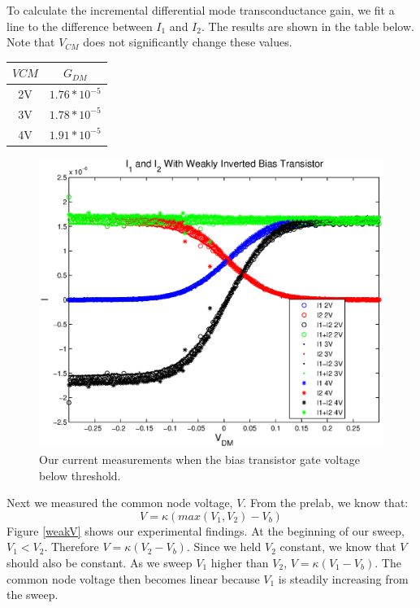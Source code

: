 \documentclass{article}
\begin{document}
To calculate the incremental differential mode transconductance gain, we fit a line to the difference between $I_1$ and $I_2$. The results are shown in the table below. Note that $V_{CM}$ does not significantly change these values.
\\
\begin{center}
\begin{tabular} {|c|c|}
\hline
$V{CM}$ & $G_{DM}$ \\ 
\hline
2V & $1.76 *10^{-5}$ \\
3V & $1.78 *10^{-5}$ \\
4V & $1.91 *10^{-5}$ \\
\hline
\end{tabular}

\end{center}

\begin{figure}[H]
\centering
\includegraphics[scale=.8]{currents_weak.eps}
\caption{Our current measurements when the bias transistor gate voltage below threshold.}
\label{weak}
\end{figure}

Next we measured the common node voltage, $V$. From the prelab, we know that: \[V= \kappa (max(V_1,V_2)-V_b)\]
Figure \ref{weakV} shows our experimental findings. At the beginning of our sweep, $V_1<V_2$. Therefore $V=\kappa(V_2-V_b)$. Since we held $V_2$ constant, we know that $V$ should also be constant. As we sweep $V_1$ higher than $V_2$, $V=\kappa(V_1-V_b)$. The common node voltage then becomes linear because $V_1$ is steadily increasing from the sweep. 
\end{document}
